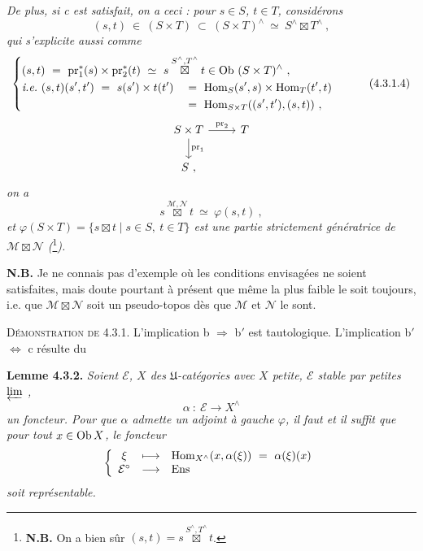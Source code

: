 \setcounter{footnote}{6}


\noindent\textit{De plus, si c est satisfait, on a ceci : pour $s\in S$, $t\in T$, considérons}
\[
(s,t)\ \in\ (S\times T)\ \subset\ (S\times T)^\wedge\ \simeq\ S^\wedge\boxtimes T^\wedge\ ,
\]
\textit{qui s'explicite aussi comme}
\[
\left\{
\begin{aligned}
&\rlap{$\displaystyle (s,t)\ =\ \pr_1^*(s)\times\pr_2^*(t)\ \simeq\ s\overset{S^\wedge,T^\wedge}{\boxtimes}t\in\Ob\,(S\times T)^\wedge\ ,$}\\
&\textit{i.e.}\ (s,t)(s',t')\ =\ s(s')\times t(t') &&=\ \Hom_S(s',s)\times\Hom_T(t',t)\\
& &&=\ \Hom_{S\times T}((s',t'),(s,t))\ ,
\end{aligned}
\right.
\tag*{(4.3.1.4)}
\]
\[
\begin{tikzcd}
S\times T \arrow[r, "\mathrm{pr}_2"] \arrow[d, "\mathrm{pr}_1"] & T\\
S\ ,
\end{tikzcd}
\]
\textit{on a}
\[
s\overset{\mathcal M,\mathcal N}{\boxtimes}t\ \simeq\ \varphi(s,t)\ ,
\tag*{(4.3.1.4)}
\]
\textit{et $\varphi(S\times T)=\{s\boxtimes t\mid s\in S,\ t\in T\}$ est une partie strictement génératrice de $\mathcal M\boxtimes\mathcal N$ (}\footnote{\textbf{N.B.} On a bien sûr $(s,t)=s\overset{S^\wedge,T^\wedge}{\boxtimes}t$.}\textit{).}

\noindent\textbf{N.B.} Je ne connais pas d'exemple où les conditions envisagées ne soient satisfaites, mais doute pourtant à présent que même la plus faible le soit toujours, i.e. que $\mathcal M\boxtimes\mathcal N$ soit un pseudo-topos dès que $\mathcal M$ et $\mathcal N$ le sont.

\noindent\textsc{Démonstration de} 4.3.1. L'implication b $\Longrightarrow$ b$'$ est tautologique. L'implication b$'$ $\Longleftrightarrow$ c résulte du

\noindent\textbf{Lemme 4.3.2.} \textit{Soient $\mathcal E$, $X$ des $\mathfrak U$-catégories avec $X$ petite, $\mathcal E$ stable par petites $\varprojlim$ ,}
\[
\alpha\ :\ \mathcal E\longrightarrow X^\wedge
\]
\textit{un foncteur. Pour que $\alpha$ admette un adjoint à gauche $\varphi$, il faut et il suffit que pour tout $x\in\mathrm{Ob}\, X$, le foncteur}
\[
\left\{
\begin{array}{ccl}
\xi & \longmapsto & \Hom_{X^\wedge}(x,\alpha(\xi))\ =\ \alpha(\xi)(x)\\
\mathcal E^\circ & \longrightarrow & \mathrm{Ens}
\end{array}
\right.
\]
\textit{soit représentable.}

